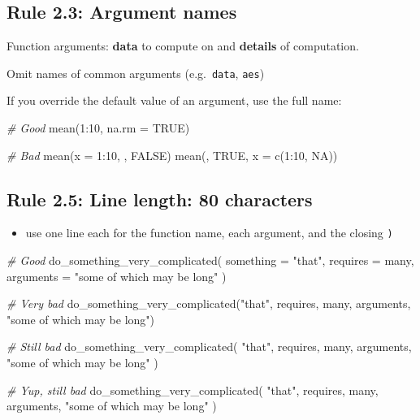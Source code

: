 \documentclass[
  letterpaper,
  DIV=11,
  numbers=noendperiod]{scrreprt}
\newenvironment{Shaded}{}{}
\newcommand{\AttributeTok}[1]{\textcolor[rgb]{0.49,0.56,0.16}{#1}}
\newcommand{\CommentTok}[1]{\textcolor[rgb]{0.38,0.63,0.69}{\textit{#1}}}
\newcommand{\ConstantTok}[1]{\textcolor[rgb]{0.53,0.00,0.00}{#1}}
\newcommand{\DecValTok}[1]{\textcolor[rgb]{0.25,0.63,0.44}{#1}}
\newcommand{\FunctionTok}[1]{\textcolor[rgb]{0.02,0.16,0.49}{#1}}
\newcommand{\NormalTok}[1]{#1}
\newcommand{\SpecialCharTok}[1]{\textcolor[rgb]{0.25,0.44,0.63}{#1}}
\newcommand{\StringTok}[1]{\textcolor[rgb]{0.25,0.44,0.63}{#1}}
\providecommand{\tightlist}{%
  \setlength{\itemsep}{0pt}\setlength{\parskip}{0pt}}\usepackage{longtable,booktabs,array}
\begin{document}
\subsection{Rule 2.3: Argument names}\label{rule-2.3-argument-names}

Function arguments: \textbf{data} to compute on and \textbf{details} of
computation.

Omit names of common arguments (e.g.~\texttt{data}, \texttt{aes})

If you override the default value of an argument, use the full name:

\begin{Shaded}
\begin{Highlighting}[]
\CommentTok{\# Good}
\FunctionTok{mean}\NormalTok{(}\DecValTok{1}\SpecialCharTok{:}\DecValTok{10}\NormalTok{, }\AttributeTok{na.rm =} \ConstantTok{TRUE}\NormalTok{)}

\CommentTok{\# Bad}
\FunctionTok{mean}\NormalTok{(}\AttributeTok{x =} \DecValTok{1}\SpecialCharTok{:}\DecValTok{10}\NormalTok{, , }\ConstantTok{FALSE}\NormalTok{)}
\FunctionTok{mean}\NormalTok{(, }\ConstantTok{TRUE}\NormalTok{, }\AttributeTok{x =} \FunctionTok{c}\NormalTok{(}\DecValTok{1}\SpecialCharTok{:}\DecValTok{10}\NormalTok{, }\ConstantTok{NA}\NormalTok{))}
\end{Highlighting}
\end{Shaded}

\subsection{Rule 2.5: Line length: 80
characters}\label{rule-2.5-line-length-80-characters}

\begin{itemize}
\tightlist
\item
  use one line each for the function name, each argument, and the
  closing \texttt{)}
\end{itemize}

\begin{Shaded}
\begin{Highlighting}[]
\CommentTok{\# Good}
\FunctionTok{do\_something\_very\_complicated}\NormalTok{(}
  \AttributeTok{something =} \StringTok{"that"}\NormalTok{,}
  \AttributeTok{requires =}\NormalTok{ many,}
  \AttributeTok{arguments =} \StringTok{"some of which may be long"}
\NormalTok{)}

\CommentTok{\# Very bad}
\FunctionTok{do\_something\_very\_complicated}\NormalTok{(}\StringTok{"that"}\NormalTok{, requires, many, arguments, }\StringTok{"some of which may be long"}\NormalTok{)}

\CommentTok{\# Still bad}
\FunctionTok{do\_something\_very\_complicated}\NormalTok{(}
  \StringTok{"that"}\NormalTok{, requires, many,}
\NormalTok{  arguments,}
  \StringTok{"some of which may be long"}
\NormalTok{)}

\CommentTok{\# Yup, still bad}
\FunctionTok{do\_something\_very\_complicated}\NormalTok{(}
  \StringTok{"that"}\NormalTok{, requires, many, arguments,}
  \StringTok{"some of which may be long"}
\NormalTok{)}
\end{Highlighting}
\end{Shaded}
\end{document}

